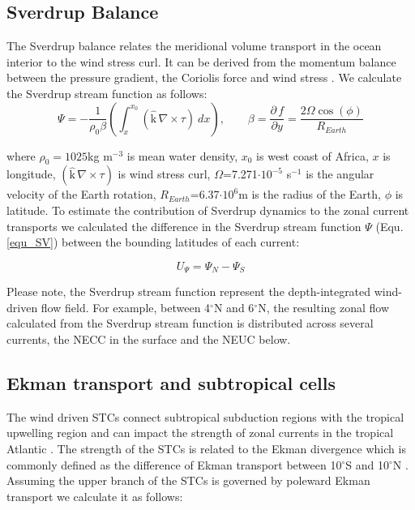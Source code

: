 \documentclass[os, manuscript]{copernicus}
\begin{document}
\subsection{Sverdrup Balance}
The Sverdrup balance relates the meridional volume transport in the ocean interior to the wind stress curl. It can be derived from the momentum balance between the pressure gradient, the Coriolis force and wind stress \citep{Sverdrup1947}. We calculate the Sverdrup stream function as follows: 
\begin{equation}
	\Psi = - \frac{1}{\rho_0\beta}\left(\int_{x}^{x_0} \left(\hat{\text{k}}\, \nabla \times \tau\right) \ dx
	\right), \qquad
	\beta = \frac{\partial\, f}{\partial y} = \frac{2\Omega \cos(\phi)}{R_{Earth}}
	\label{equ_SV}
\end{equation}

where $\rho_0=1025$kg m$^{-3}$ is mean water density, $x_0$ is west coast of Africa, $x$ is longitude, $(\hat{\text{k}}\, \nabla \times \tau)$ is wind stress curl, $\Omega$=7.271$\cdot 10^{-5}$ s$^{-1}$ is the angular velocity of the Earth rotation, $R_{Earth}$=6.37$\cdot 10^6$m is the radius of the Earth, $\phi$ is latitude. To estimate the contribution of Sverdrup dynamics to the zonal current transports we calculated the difference in the Sverdrup stream function $\Psi$ (Equ. \ref{equ_SV}) between the bounding latitudes of each current:

\begin{equation}
	U_{\Psi} = \Psi_N - \Psi_S
	\label{equ_SV_diff}
\end{equation}

Please note, the Sverdrup stream function represent the depth-integrated wind-driven flow field. For example, between 4$^{\circ}$N and 6$^{\circ}$N, the resulting zonal flow calculated from the Sverdrup stream function is distributed across several currents, the NECC in the surface and the NEUC below.

\subsection{Ekman transport and subtropical cells}
The wind driven STCs connect subtropical subduction regions with the tropical upwelling region \citep[e.g.,][]{Schott2004,Tuchen2019} and can impact the strength of zonal currents in the tropical Atlantic \citep{Rabe2008}. The strength of the STCs is related to the Ekman divergence which is commonly defined as the difference of Ekman transport between 10$^{\circ}$S and 10$^{\circ}$N \citep{Rabe2008,Tuchen2019}. Assuming the upper branch of the STCs is governed by poleward Ekman transport we calculate it as follows:
\end{document}
